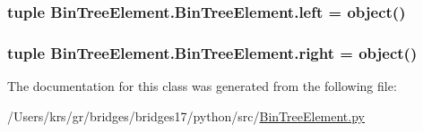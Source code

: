 \subsubsection[{left}]{\setlength{\rightskip}{0pt plus 5cm}tuple Bin\+Tree\+Element.\+Bin\+Tree\+Element.\+left = object()\hspace{0.3cm}{\ttfamily [static]}}\label{class_bin_tree_element_1_1_bin_tree_element_aa757940232835711bd16b58e67eae9fb}
\hypertarget{class_bin_tree_element_1_1_bin_tree_element_a96aa549e65f62466b8637ad16f1c2292}{}
\subsubsection[{right}]{\setlength{\rightskip}{0pt plus 5cm}tuple Bin\+Tree\+Element.\+Bin\+Tree\+Element.\+right = object()\hspace{0.3cm}{\ttfamily [static]}}\label{class_bin_tree_element_1_1_bin_tree_element_a96aa549e65f62466b8637ad16f1c2292}


The documentation for this class was generated from the following file\+:\begin{DoxyCompactItemize}
\item 
/\+Users/krs/gr/bridges/bridges17/python/src/\hyperlink{_bin_tree_element_8py}{Bin\+Tree\+Element.\+py}\end{DoxyCompactItemize}
